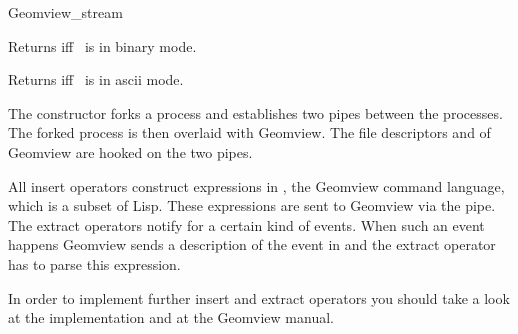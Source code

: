 \begin{ccRefClass}{Geomview_stream}
\begin{ccAdvanced}
{Returns  iff \ccVar\ is in binary mode.}

{Returns  iff \ccVar\ is in ascii mode.}

\end{ccAdvanced}

\ccImplementation

The constructor forks a process and establishes two pipes between the
processes. The forked process is then overlaid with Geomview. The
file descriptors  and  of Geomview are hooked
on the two pipes.

All insert operators construct expressions in , the Geomview
command language, which is a subset of {\sc Lisp}. These expressions
are sent to Geomview via the pipe. The extract operators notify 
for a certain kind of events. When such an event happens Geomview
sends a description of the event in  and the extract operator has
to parse this expression.

In order to implement further insert and extract operators you should
take a look at the implementation and at the Geomview manual.








\end{ccRefClass}


